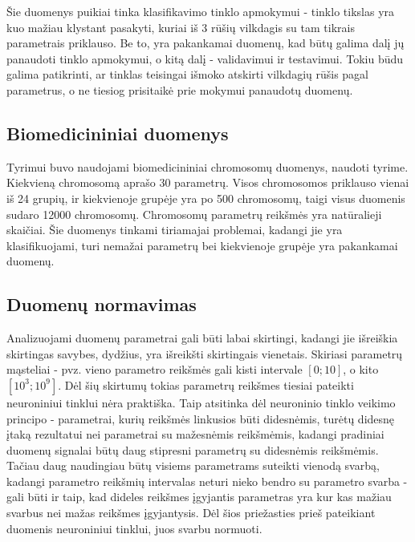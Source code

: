 \documentclass{VUMIFPSbakalaurinis}
\begin{document}
Šie duomenys puikiai tinka klasifikavimo tinklo apmokymui - tinklo tikslas yra kuo mažiau klystant pasakyti, kuriai iš 3 rūšių vilkdagis su tam tikrais parametrais priklauso.
Be to, yra pakankamai duomenų, kad būtų galima dalį jų panaudoti tinklo apmokymui, o kitą dalį - validavimui ir testavimui.
Tokiu būdu galima patikrinti, ar tinklas teisingai išmoko atskirti vilkdagių rūšis pagal parametrus, o ne tiesiog prisitaikė prie mokymui panaudotų duomenų.



\subsection{Biomedicininiai duomenys}

Tyrimui buvo naudojami biomedicininiai chromosomų duomenys, naudoti \cite[289~psl.]{price-dimensionality-reduction} tyrime.
Kiekvieną chromosomą aprašo 30 parametrų.
Visos chromosomos priklauso vienai iš 24 grupių, ir kiekvienoje grupėje yra po 500 chromosomų, taigi visus duomenis sudaro 12000 chromosomų.
Chromosomų parametrų reikšmės yra natūralieji skaičiai.
Šie duomenys tinkami tiriamajai problemai, kadangi jie yra klasifikuojami, turi nemažai parametrų bei kiekvienoje grupėje yra pakankamai duomenų.



\subsection{Duomenų normavimas}

Analizuojami duomenų parametrai gali būti labai skirtingi, kadangi jie išreiškia skirtingas savybes, dydžius, yra išreikšti skirtingais vienetais.
Skiriasi parametrų mąsteliai - pvz. vieno parametro reikšmės gali kisti intervale $[0; 10]$, o kito $[10^3; 10^9]$.
Dėl šių skirtumų tokias parametrų reikšmes tiesiai pateikti neuroniniui tinklui nėra praktiška.
Taip atsitinka dėl neuroninio tinklo veikimo principo - parametrai, kurių reikšmės linkusios būti didesnėmis, turėtų didesnę įtaką rezultatui nei parametrai su mažesnėmis reikšmėmis, kadangi pradiniai duomenų signalai būtų daug stipresni parametrų su didesnėmis reikšmėmis.
Tačiau daug naudingiau būtų visiems parametrams suteikti vienodą svarbą, kadangi parametro reikšmių intervalas neturi nieko bendro su parametro svarba - gali būti ir taip, kad dideles reikšmes įgyjantis parametras yra kur kas mažiau svarbus nei mažas reikšmes įgyjantysis.
Dėl šios priežasties prieš pateikiant duomenis neuroniniui tinklui, juos svarbu normuoti.
\end{document}
